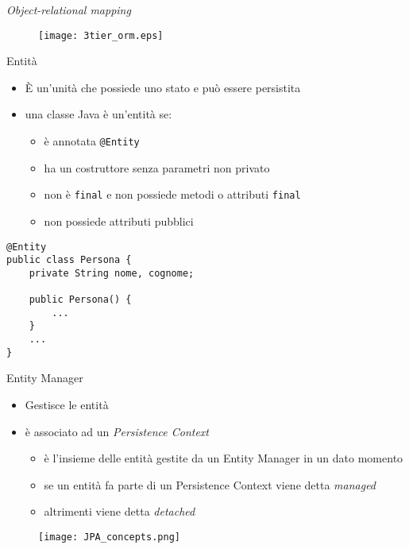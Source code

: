\begin{frame}{\textsl{Object-relational mapping}}

\begin{figure}
	\centering
	\texttt{[image: 3tier\_orm.eps]}
\end{figure}

\end{frame}



\begin{frame}[fragile]{Entità}


\begin{itemize}
\item È un'unità che possiede uno stato e può essere persistita
\item una classe Java è un'entità se:
	\begin{itemize}
	\item è annotata \texttt{@Entity}
	\item ha un costruttore senza parametri non privato
	\item non è \texttt{final} e non possiede metodi o attributi \texttt{final}
	\item non possiede attributi pubblici
	\end{itemize}
\end{itemize}


\begin{lstlisting}[xleftmargin=0.3\textwidth,  basicstyle={\tiny\ttfamily}]
@Entity
public class Persona {
    private String nome, cognome;
    
    public Persona() {
        ...
    }
    ...
}
\end{lstlisting}



\end{frame}



\begin{frame}{Entity Manager}


\begin{itemize}
\item Gestisce le entità
\item è associato ad un \textsl{Persistence Context}
	\begin{itemize}
	\item è l'insieme delle entità gestite da un Entity Manager in un dato momento
	\item se un entità fa parte di un Persistence Context viene detta \textsl{managed}
	\item altrimenti viene detta \textsl{detached}
	\end{itemize}
\end{itemize}

\begin{figure}
	\centering
	\texttt{[image: JPA\_concepts.png]}
\end{figure}


\end{frame}

